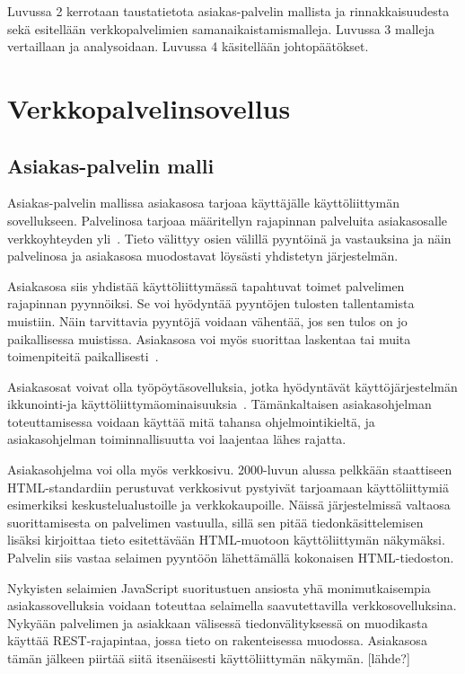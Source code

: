 \documentclass[finnish]{tktltiki2}
\theoremstyle{definition}
\theoremstyle{remark}
\begin{document}
Luvussa 2 kerrotaan taustatietota asiakas-palvelin mallista ja rinnakkaisuudesta sekä
esitellään verkkopalvelimien samanaikaistamismalleja. Luvussa 3
malleja vertaillaan ja analysoidaan. Luvussa 4 käsitellään johtopäätökset.
\section{Verkkopalvelinsovellus}
\subsection{Asiakas-palvelin malli}
Asiakas-palvelin mallissa
asiakasosa tarjoaa käyttäjälle käyttöliittymän sovellukseen. Palvelinosa
tarjoaa määritellyn rajapinnan
palveluita asiakasosalle verkkoyhteyden yli~\cite{sinha_client-server_1992}.
Tieto välittyy osien välillä pyyntöinä ja vastauksina ja näin palvelinosa ja asiakasosa
muodostavat löysästi yhdistetyn järjestelmän.

Asiakasosa siis yhdistää käyttöliittymässä tapahtuvat toimet palvelimen
rajapinnan pyynnöiksi. Se voi hyödyntää pyyntöjen tulosten tallentamista
muistiin. Näin tarvittavia pyyntöjä voidaan vähentää, jos sen tulos
on jo paikallisessa muistissa. Asiakasosa voi myös suorittaa
laskentaa tai muita toimenpiteitä paikallisesti~\cite{sinha_client-server_1992}.

Asiakasosat voivat olla työpöytäsovelluksia, jotka hyödyntävät käyttöjärjestelmän
ikkunointi-ja käyttöliittymäominaisuuksia~\cite{sinha_client-server_1992}.
Tämänkaltaisen asiakasohjelman toteuttamisessa voidaan käyttää mitä tahansa ohjelmointikieltä,
ja asiakasohjelman toiminnallisuutta voi laajentaa lähes rajatta.

Asiakasohjelma voi olla myös verkkosivu. 2000-luvun alussa
pelkkään staattiseen HTML-standardiin perustuvat verkkosivut pystyivät
tarjoamaan käyttöliittymiä esimerkiksi keskustelualustoille ja verkkokaupoille.
Näissä järjestelmissä valtaosa suorittamisesta on palvelimen vastuulla,
sillä sen pitää tiedonkäsittelemisen lisäksi kirjoittaa tieto
esitettävään HTML-muotoon käyttöliittymän näkymäksi. Palvelin
siis vastaa selaimen pyyntöön lähettämällä kokonaisen HTML-tiedoston.

Nykyisten selaimien JavaScript suoritustuen ansiosta yhä
monimutkaisempia asiakassovelluksia voidaan toteuttaa
selaimella saavutettavilla verkkosovelluksina.
Nykyään palvelimen ja asiakkaan
välisessä tiedonvälityksessä on muodikasta käyttää REST-rajapintaa, jossa
tieto on rakenteisessa muodossa. Asiakasosa tämän jälkeen piirtää siitä
itsenäisesti käyttöliittymän näkymän. [lähde?]
\end{document}
